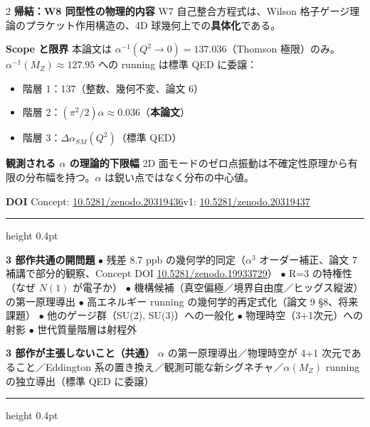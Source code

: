 \documentclass[9pt,a4paper]{ltjsarticle}
\begin{document}
\begin{multicols}{2}
\smallskip
\textbf{帰結：W8 同型性の物理的内容}\enspace
W7 自己整合方程式は、Wilson 格子ゲージ理論のプラケット作用構造の、4D 球幾何上での\textbf{具体化}である。

\smallskip
\textbf{Scope と限界}\enspace
本論文は $\alpha^{-1}(Q^2 \to 0) = 137.036$（Thomson 極限）のみ。$\alpha^{-1}(M_Z) \approx 127.95$ への running は標準 QED に委譲：
\begin{itemize}[topsep=1pt]
\item 階層 1：137（整数、幾何不変、論文 6）
\item 階層 2：$(\pi^2/2)\alpha \approx 0.036$（\textbf{本論文}）
\item 階層 3：$\Delta\alpha_{SM}(Q^2)$（標準 QED）
\end{itemize}

\smallskip
\textbf{観測される $\alpha$ の理論的下限幅}\enspace
2D 面モードのゼロ点振動は不確定性原理から有限の分布幅を持つ。$\alpha$ は鋭い点ではなく分布の中心値。

\smallskip
\textbf{DOI}\enspace
{\scriptsize Concept: \href{https://doi.org/10.5281/zenodo.20319436}{10.5281/zenodo.20319436}\enspace v1: \href{https://doi.org/10.5281/zenodo.20319437}{10.5281/zenodo.20319437}}

\end{multicols}

\vspace{2pt}
\hrule height 0.4pt
\vspace{3pt}

\textbf{\small 3 部作共通の開問題}\enspace
{\footnotesize $\bullet$ 残差 8.7 ppb の幾何学的同定（$\alpha^3$ オーダー補正、論文 7 補講で部分的観察、Concept DOI \href{https://doi.org/10.5281/zenodo.19933729}{10.5281/zenodo.19933729}）\enspace
$\bullet$ R=3 の特権性（なぜ $N(1)$ が電子か）\enspace
$\bullet$ 機構候補（真空偏極／境界自由度／ヒッグス縦波）の第一原理導出\enspace
$\bullet$ 高エネルギー running の幾何学的再定式化（論文 9 §8、将来課題）\enspace
$\bullet$ 他のゲージ群（SU(2), SU(3)）への一般化\enspace
$\bullet$ 物理時空（3+1次元）への射影\enspace
$\bullet$ 世代質量階層は射程外}

\smallskip
\textbf{\small 3 部作が主張しないこと（共通）}\enspace
{\footnotesize $\alpha$ の第一原理導出／物理時空が 4+1 次元であること／Eddington 系の置き換え／観測可能な新シグネチャ／$\alpha(M_Z)$ running の独立導出（標準 QED に委譲）}

\vspace{3pt}
\hrule height 0.4pt
\vspace{3pt}
\end{document}
